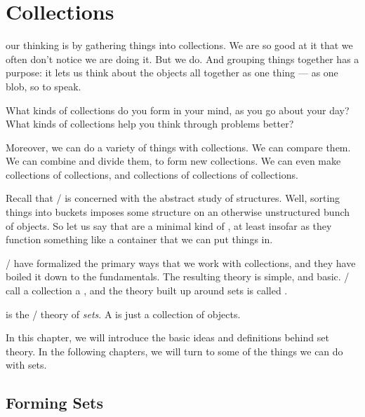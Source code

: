 \documentclass[../../../main.tex]{subfiles}
\begin{document}
\chapter{Collections}

 our thinking is by gathering things into collections. We are so good at it that we often don't notice we are doing it. But we do. And grouping things together has a purpose: it lets us think about the objects all together as one thing --- as one blob, so to speak.

\begin{ponder}
  What kinds of collections do you form in your mind, as you go about your day? What kinds of collections help you think through problems better?
\end{ponder}

Moreover, we can do a variety of things with collections. We can compare them. We can combine and divide them, to form new collections. We can even make collections of collections, and collections of collections of collections.

Recall that \math/ is concerned with the abstract study of structures. Well, sorting things into buckets imposes some structure on an otherwise unstructured bunch of objects. So let us say that  are a minimal kind of , at least insofar as they function something like a container that we can put things in.

\Mathers/ have formalized the primary ways that we work with collections, and they have boiled it down to the fundamentals. The resulting theory is simple, and basic. \Mathers/ call a collection a , and the theory built up around sets is called . 

\begin{terminology}
   is the \mathical/ theory of \emph{sets}. A  is just a collection of objects.
\end{terminology}

In this chapter, we will introduce the basic ideas and definitions behind set theory. In the following chapters, we will turn to some of the things we can do with sets.


\section{Forming Sets}
\end{document}
